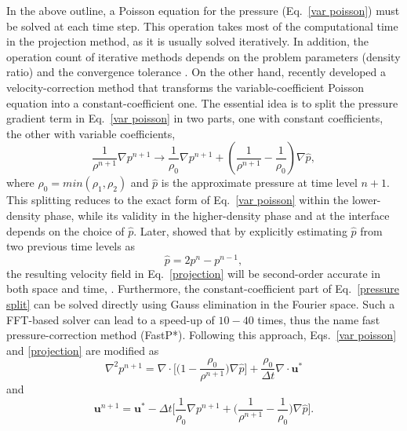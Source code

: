 In the above outline, a Poisson equation for the pressure (Eq.\ \eqref{var poisson}) must be solved at each time step. This operation takes most of the computational time in the projection method, as it is usually solved iteratively. In addition, the operation count of iterative methods depends on the problem parameters (\eg density ratio) and the convergence tolerance \citep{Dodd_JCP_2014}. On the other hand, \cite{Dong_JCP_2012} recently developed a velocity-correction method that transforms the variable-coefficient Poisson equation into a constant-coefficient one. The essential idea is to split the pressure gradient term in Eq.\ \eqref{var poisson} in two parts, one with constant coefficients, the other with variable coefficients, \ie
\begin{equation}
    \frac{1}{\rho^{n+1}} \nabla p^{n+1} \rightarrow \frac{1}{\rho_0} \nabla p^{n+1} + ( \frac{1}{\rho^{n+1}} - \frac{1}{\rho_0} ) \nabla \hat{p},
  \label{pressure split}
\end{equation}
where $\rho_0=min(\rho_1,\rho_2)$ and $\hat{p}$ is the approximate pressure at time level $n+1$. This splitting reduces to the exact form of Eq.\ \eqref{var poisson} within the lower-density phase, while its validity in the higher-density phase and at the interface depends on the choice of $\hat{p}$. Later, \cite{Dodd_JCP_2014} showed that by explicitly estimating $\hat{p}$ from two previous time levels as
\begin{equation}
    \hat{p} = 2p^{n}-p^{n-1},
  \label{pressure approx}
\end{equation}
the resulting velocity field in Eq.\ \eqref{projection} will be second-order accurate in both space and time, %
.
Furthermore, %
the constant-coefficient part of Eq.\ \eqref{pressure split} can be solved directly using Gauss elimination in the Fourier space. Such a FFT-based solver can lead to a speed-up of $10-40$ times, thus the name fast pressure-correction method (FastP*). Following this approach, Eqs.\ \eqref{var poisson} and \eqref{projection} are modified as
\begin{equation}
  \nabla^2 p^{n+1} = \nabla \cdot \bigg[ \big(1-\frac{\rho_0}{\rho^{n+1}}) \nabla \hat{p} \bigg] +  \frac{\rho_0}{\Delta t}\nabla \cdot {\bm u}^*
  \label{poisson split}
\end{equation}
\noindent and
\begin{equation}
    {\bm u}^{n+1} = {\bm u}^* -\Delta t \bigg[\frac{1}{\rho_0} \nabla p^{n+1} + \big(\frac{1}{\rho^{n+1}} - \frac{1}{\rho_0}\big)\nabla \hat{p} \bigg].
  \label{projection 1}
\end{equation}


